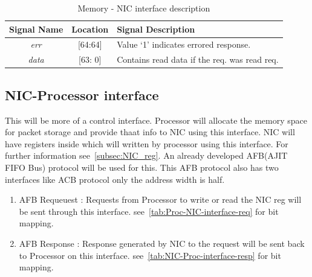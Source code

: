\documentclass[a4paper,11pt, final]{report}
\begin{document}
				\begin{table}[!htbp]
					\centering
					\begin{tabular}{ccl}
						\hline
						\textbf{Signal Name} 		& \textbf{Location} 		&\textbf{Signal Description}  \\ \hline
						\textit{err}			& [64:64]			& Value `1' indicates errored response.\\\hline
						\textit{data}   		& [63: 0] 			& Contains read data if the req. was read req.\\ \hline
					\end{tabular}
					\caption{Memory - NIC interface description}
					\label{tab:Memory-NIC-interface-resp}
				\end{table}
			
		\subsection{NIC-Processor interface}
			This will be more of a control interface. Processor will allocate the memory space for packet storage and provide thaat info to NIC using this interface.
			NIC will have registers inside which will written by processor using this interface. For further information see~\ref{subsec:NIC_reg}. An already developed
			AFB(AJIT FIFO Bus) protocol will be used for this. This AFB protocol also has two interfaces like ACB protocol only the address width is half.

			\begin{enumerate}
				\item AFB Requeuest : Requests from Processor to write or read the NIC reg will be sent through this interface. see~\ref{tab:Proc-NIC-interface-req} for bit mapping.
				\item AFB Response : Response generated by NIC to the request will be sent back to Processor on this interface. see~\ref{tab:NIC-Proc-interface-resp} for bit mapping.
			\end{enumerate}
\end{document}
